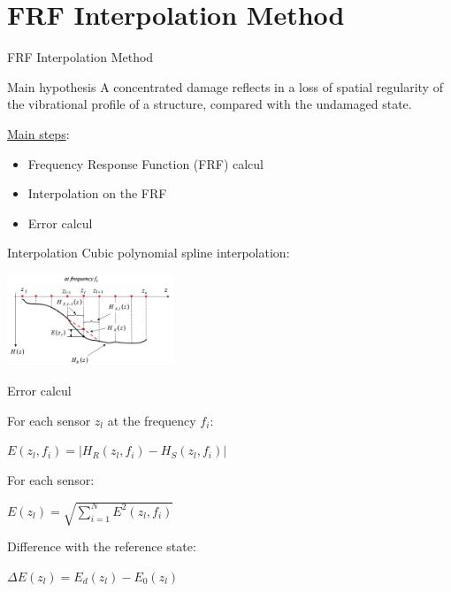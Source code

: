 \documentclass{beamer}
\begin{document}
\section{FRF Interpolation Method}


\begin{frame}{FRF Interpolation Method}

\begin{alertblock}{Main hypothesis}
A concentrated damage reflects
in a loss of spatial regularity of the vibrational profile of a
structure, compared with the undamaged state.
\end{alertblock}


\underline{Main steps}:
\begin{itemize}
\item Frequency Response Function (FRF) calcul
\item Interpolation on the FRF
\item Error calcul
\end{itemize}


\end{frame}


\begin{frame}{Interpolation}
Cubic polynomial spline interpolation:

\begin{center}
\includegraphics[width=5cm]{images/interpolation.png}
\end{center}

\end{frame}


\begin{frame}{Error calcul}

For each sensor $z_l$ at the frequency $f_i$:
\begin{center}
$E(z_l,f_i) = | H_R(z_l,f_i) - H_S(z_l,f_i) |$
\end{center}


For each sensor:
\begin{center}
$E(z_l) = \sqrt{  \sum\limits_{i=1}^N  E^2(z_l,f_i) }$
\end{center}


Difference with the reference state:
\begin{center}
$\Delta E(z_l) = E_d(z_l) - E_0(z_l)$
\end{center}

\end{frame}
\end{document}
